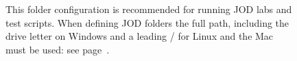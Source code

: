 \begin{figure}[htbp]
  \centering
  \hfill
\caption[JOD Folders]{This folder configuration is recommended for 
running JOD labs and test scripts. 
When defining JOD folders the full path, including the drive letter on Windows and a
leading / for Linux and the Mac must be used: see page~\pageref{lst:foldercfg}.} 
  \label{eps:jodfolders}
\end{figure}
